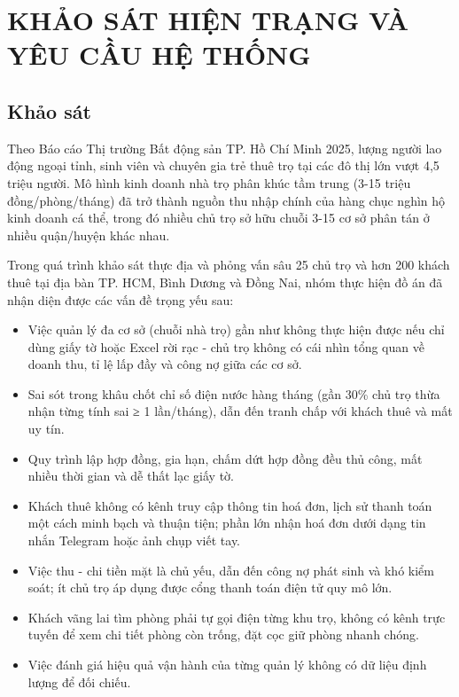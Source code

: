 \chapter{KHẢO SÁT HIỆN TRẠNG VÀ YÊU CẦU HỆ THỐNG}

\section{Khảo sát}

Theo Báo cáo Thị trường Bất động sản TP. Hồ Chí Minh 2025, lượng người
lao động ngoại tỉnh, sinh viên và chuyên gia trẻ thuê trọ tại các đô thị
lớn vượt 4,5 triệu người. Mô hình kinh doanh nhà trọ phân khúc tầm trung
(3-15 triệu đồng/phòng/tháng) đã trở thành nguồn thu nhập chính của hàng
chục nghìn hộ kinh doanh cá thể, trong đó nhiều chủ trọ sở hữu chuỗi
3-15 cơ sở phân tán ở nhiều quận/huyện khác nhau.

Trong quá trình khảo sát thực địa và phỏng vấn sâu 25 chủ trọ và hơn 200
khách thuê tại địa bàn TP. HCM, Bình Dương và Đồng Nai, nhóm thực hiện
đồ án đã nhận diện được các vấn đề trọng yếu sau:

\begin{itemize}
\item
  Việc quản lý đa cơ sở (chuỗi nhà trọ) gần như không thực hiện được nếu
  chỉ dùng giấy tờ hoặc Excel rời rạc - chủ trọ không có cái nhìn tổng
  quan về doanh thu, tỉ lệ lấp đầy và công nợ giữa các cơ sở.
\item
  Sai sót trong khâu chốt chỉ số điện nước hàng tháng (gần 30\% chủ trọ
  thừa nhận từng tính sai ≥ 1 lần/tháng), dẫn đến tranh chấp với khách
  thuê và mất uy tín.
\item
  Quy trình lập hợp đồng, gia hạn, chấm dứt hợp đồng đều thủ công, mất
  nhiều thời gian và dễ thất lạc giấy tờ.
\item
  Khách thuê không có kênh truy cập thông tin hoá đơn, lịch sử thanh
  toán một cách minh bạch và thuận tiện; phần lớn nhận hoá đơn dưới dạng
  tin nhắn Telegram hoặc ảnh chụp viết tay.
\item
  Việc thu - chi tiền mặt là chủ yếu, dẫn đến công nợ phát sinh và khó
  kiểm soát; ít chủ trọ áp dụng được cổng thanh toán điện tử quy mô lớn.
\item
  Khách vãng lai tìm phòng phải tự gọi điện từng khu trọ, không có kênh
  trực tuyến để xem chi tiết phòng còn trống, đặt cọc giữ phòng nhanh
  chóng.
\item
  Việc đánh giá hiệu quả vận hành của từng quản lý không có dữ liệu định
  lượng để đối chiếu.
\end{itemize}

